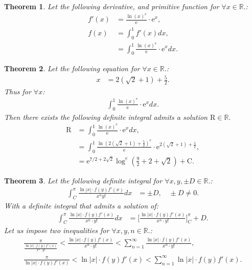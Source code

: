 \documentclass[10pt]{article}
\theoremstyle{plain}
\newtheorem{theorem}{Theorem}[section]
\theoremstyle{definition}
\theoremstyle{remark}
\begin{document}
\begin{theorem}
	Let the following derivative, and primitive function for $\forall x \in \mathbb{R}.$:
	\begin{align*}
		f'(x)&= \frac{\ln (x)^{\mathrm{e}}}{\mathrm{e}} \cdot \mathrm{e}^{x},\\
		f(x) &= \int_{0}^{1} f'(x)dx,\\
		&= \int_{0}^{1} \frac{\ln (x)^{\mathrm{e}}}{\mathrm{e}} \cdot \mathrm{e}^{x} dx.
	\end{align*}
\end{theorem}

\begin{theorem}
	Let the following equation for $\forall x \in \mathbb{R}.$:
	\begin{align*}
		x &= 2(\sqrt{2} + 1) + \frac{5}{2}.
	\end{align*}
	Thus for $\forall x$:
	\begin{align*}
		\int_{0}^{1} \frac{\ln (x)^{\mathrm{e}}}{\mathrm{e}} \cdot \mathrm{e}^{x} dx.
	\end{align*}
	Then there exists the following definite integral admits a solution $\mathrm{R} \in \mathbb{R}.$
	\begin{align*}
		\mathrm{R} &= \int_{0}^{1} \frac{\ln (x)^{\mathrm{e}}}{\mathrm{e}} \cdot \mathrm{e}^{x} dx,\\
		&= \int_{0}^{1} \frac{\ln (2(\sqrt{2} + 1) + \frac{5}{2})^{\mathrm{e}}}{\mathrm{e}} \cdot \mathrm{e}^{2(\sqrt{2} + 1) + \frac{5}{2}},\\
		&= \mathrm{e}^{7/2+2 \sqrt{2}} \log^{e}(\frac{9}{2}+2+\sqrt{2}) + \mathrm{C}.
	\end{align*}
\end{theorem}

\begin{theorem}
	Let the following definite integral for $\forall x, y, \pm D \in \mathbb{R}.$:
	\begin{align*}
		\int_{C}^{\pi} \frac{ \ln |x| \cdot f(y)f'(x) }{x^{n}y!} dx &= \pm D, \quad \pm D \neq 0.
	\end{align*}
	With a definite integral that admits a solution of:
	\begin{align*}
		\int_{C}^{\pi} \frac{ \ln |x| \cdot f(y)f'(x) }{x^{n} \cdot y!} dx &= \big[\frac{ \ln |x| \cdot f(y)f'(x) }{x^{n} \cdot y!}\big]_{C}^{\pi} + D.
	\end{align*}
	Let us impose two inequalities for $\forall x, y, n \in \mathbb{R}.$:
	\begin{align*}
		\frac{\pi}{\frac{ \ln |x| \cdot f(y)f'(x) }{x^{n} \cdot  y!}} < \frac{ \ln |x| \cdot f(y)f'(x) }{x^{n} \cdot y!} < \sum_{n=1}^{\infty} \frac{ \ln |x| \cdot f(y)f'(x) }{x^{n} \cdot y!},\\
	\frac{\pi}{\ln |x| \cdot f(y)f'(x) } < \ln |x| \cdot f(y)f'(x)  < \sum_{n=1}^{\infty} \ln |x| \cdot f(y)f'(x).
	\end{align*}
\end{theorem}
\end{document}
